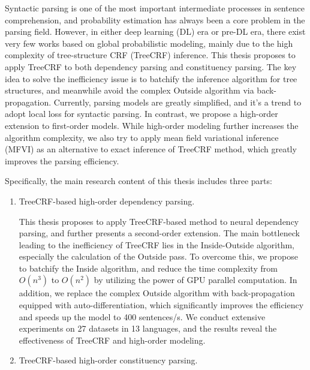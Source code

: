 
\begin{eabstract}
	Syntactic parsing is one of the most important intermediate processes in sentence comprehension,
	and probability estimation has always been a core problem in the parsing field.
	However, in either deep learning (DL) era or pre-DL era, there exist very few works based on global probabilistic modeling, mainly due to the high complexity of tree-structure CRF (TreeCRF) inference.
	This thesis proposes to apply TreeCRF to both dependency parsing and constituency parsing.
	The key idea to solve the inefficiency issue is to batchify the inference algorithm for tree structures, and meanwhile avoid the complex Outside algorithm via back-propagation.
	Currently, parsing models are greatly simplified, and it's a trend to adopt local loss for syntactic parsing.
	In contrast, we propose a high-order extension to first-order models.
	While high-order modeling further increases the algorithm complexity, we also try to apply mean field variational inference (MFVI) as an alternative to exact inference of TreeCRF method, which greatly improves the parsing efficiency.

	Specifically, the main research content of this thesis includes three parts:

	\begin{enumerate}

		\item TreeCRF-based high-order dependency parsing.

		      This thesis proposes to apply TreeCRF-based method to neural dependency parsing, and further presents a second-order extension.
		      The main bottleneck leading to the inefficiency of TreeCRF lies in the Inside-Outside algorithm, especially the calculation of the Outside pass.
		      To overcome this, we propose to batchify the Inside algorithm, and reduce the time complexity from $O(n^3)$ to $O(n^2)$ by utilizing the power of GPU parallel computation.
		      In addition, we replace the complex Outside algorithm with back-propagation equipped with auto-differentiation, which significantly improves the efficiency and speeds up the model to 400 sentences/s.
		      We conduct extensive experiments on 27 datasets in 13 languages, and the results reveal the effectiveness of TreeCRF and high-order modeling.

		\item TreeCRF-based high-order constituency parsing.


\end{enumerate}
\end{eabstract}

